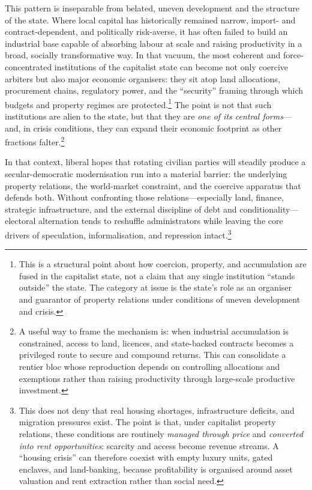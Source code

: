 This pattern is inseparable from belated, uneven development and the structure of the state. Where local
capital has historically remained narrow, import- and contract-dependent, and politically risk-averse, it has
often failed to build an industrial base capable of absorbing labour at scale and raising productivity in a
broad, socially transformative way. In that vacuum, the most coherent and force-concentrated institutions of
the capitalist state can become not only coercive arbiters but also major economic organisers: they sit atop
land allocations, procurement chains, regulatory power, and the ``security'' framing through which budgets and
property regimes are protected.\footnote{This is a structural point about how coercion, property, and accumulation are fused in the capitalist state, not a claim that any single institution ``stands outside'' the state. The category at issue is the state's role as an organiser and guarantor of property relations under conditions of uneven development and crisis.}
The point is not that such institutions are alien to the state, but that they
are \emph{one of its central forms}---and, in crisis conditions, they can expand their economic footprint as
other fractions falter.\footnote{A useful way to frame the mechanism is: when industrial accumulation is constrained, access to land, licences, and state-backed contracts becomes a privileged route to secure and compound returns. This can consolidate a rentier bloc whose reproduction depends on controlling allocations and exemptions rather than raising productivity through large-scale productive investment.}

In that context, liberal hopes that rotating civilian parties will steadily produce a secular-democratic
modernisation run into a material barrier: the underlying property relations, the world-market constraint, and
the coercive apparatus that defends both. Without confronting those relations---especially land, finance,
strategic infrastructure, and the external discipline of debt and conditionality---electoral alternation tends
to reshuffle administrators while leaving the core drivers of speculation, informalisation, and repression
intact.\cite{StrugglePK_WorldPerspectives,PeetUnholyTrinity}\footnote{This does not deny that real housing shortages, infrastructure deficits, and migration pressures exist. The point is that, under capitalist property relations, these conditions are routinely \emph{managed through price} and \emph{converted into rent opportunities}: scarcity and access become revenue streams. A ``housing crisis'' can therefore coexist with empty luxury units, gated enclaves, and land-banking, because profitability is organised around asset valuation and rent extraction rather than social need.}

